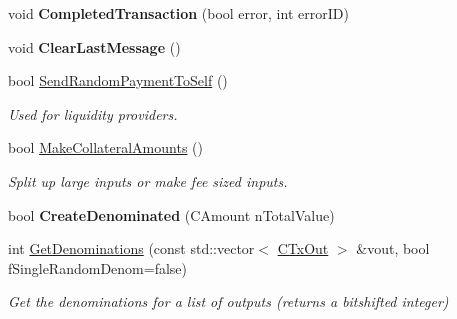 \begin{DoxyCompactItemize}
\mbox{\label{class_c_obfuscation_pool_aedb6e9803d8ce41826df9c5d9bdee95f}} 
void {\bfseries Completed\+Transaction} (bool error, int error\+ID)
\item 
\mbox{\label{class_c_obfuscation_pool_a05c668a577b298f0ac266d81f4a2930c}} 
void {\bfseries Clear\+Last\+Message} ()
\item 
\mbox{\label{class_c_obfuscation_pool_affb5b52b4711d26bbe8b0278d7bb95e1}} 
bool \mbox{\hyperlink{class_c_obfuscation_pool_affb5b52b4711d26bbe8b0278d7bb95e1}{Send\+Random\+Payment\+To\+Self}} ()
\begin{DoxyCompactList}\small\item\em Used for liquidity providers. \end{DoxyCompactList}\item 
\mbox{\label{class_c_obfuscation_pool_a7496f4e868d633d45b9c92af0cc56ac5}} 
bool \mbox{\hyperlink{class_c_obfuscation_pool_a7496f4e868d633d45b9c92af0cc56ac5}{Make\+Collateral\+Amounts}} ()
\begin{DoxyCompactList}\small\item\em Split up large inputs or make fee sized inputs. \end{DoxyCompactList}\item 
\mbox{\label{class_c_obfuscation_pool_a95e6023ca617da294132311b30179c55}} 
bool {\bfseries Create\+Denominated} (C\+Amount n\+Total\+Value)
\item 
\mbox{\label{class_c_obfuscation_pool_a01a9df16bbb4278f63aa441a0cc59e2f}} 
int \mbox{\hyperlink{class_c_obfuscation_pool_a01a9df16bbb4278f63aa441a0cc59e2f}{Get\+Denominations}} (const std\+::vector$<$ \mbox{\hyperlink{class_c_tx_out}{C\+Tx\+Out}} $>$ \&vout, bool f\+Single\+Random\+Denom=false)
\begin{DoxyCompactList}\small\item\em Get the denominations for a list of outputs (returns a bitshifted integer) \end{DoxyCompactList}\item 
\mbox{\label{class_c_obfuscation_pool_a4954bcc549403903f406fb387b79f274}} 

\end{DoxyCompactItemize}
